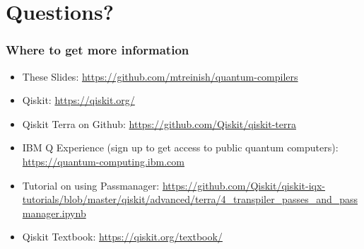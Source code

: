 \documentclass[aspectratio=169,11pt,hyperref={colorlinks=true}]{beamer}
\begin{document}
\section{Questions?}
\begin{frame}
\frametitle{Where to get more information}
    \begin{itemize}
        \item These Slides: \href{https://github.com/mtreinish/quantum-compilers}{https://github.com/mtreinish/quantum-compilers}
        \item Qiskit: \href{https://qiskit.org/}{https://qiskit.org/}
        \item Qiskit Terra on Github: \href{https://github.com/Qiskit/qiskit-terra}{https://github.com/Qiskit/qiskit-terra}
        \item IBM Q Experience (sign up to get access to public quantum computers): \href{https://quantum-computing.ibm.com}{https://quantum-computing.ibm.com}
        \item Tutorial on using Passmanager: {\small \href{https://github.com/Qiskit/qiskit-iqx-tutorials/blob/master/qiskit/advanced/terra/4\_transpiler\_passes\_and\_passmanager.ipynb}{https://github.com/Qiskit/qiskit-iqx-tutorials/blob/master/qiskit/advanced/terra/4\_transpiler\_passes\_and\_passmanager.ipynb}}
        \item Qiskit Textbook: \href{https://qiskit.org/textbook/}{https://qiskit.org/textbook/}
    \end{itemize}
\end{frame}

\end{document}
